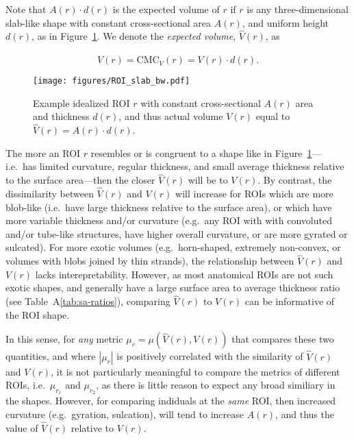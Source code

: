 \documentclass{article}
\begin{document}
Note that \(A(r) \cdot d(r)\) is the expected volume of \(r\) if \(r\) is any
three-dimensional slab-like shape with constant cross-sectional area
\(A(r)\), and uniform height \(d(r)\), as in Figure~\ref{fig:slab}. We denote
the \emph{expected volume}, \(\hat{V}(r)\), as

\begin{equation}
\hat{V}(r) = \text{CMC}_{V}(r) = V(r) \cdot d(r).
\end{equation}

\begin{figure}
	\centering
	\texttt{[image: figures/ROI\_slab\_bw.pdf]}
	\caption{Example idealized ROI \(r\) with constant cross-sectional \(A(r)\)
	area and thickness \(d(r)\), and thus actual volume \(V(r)\) equal to
	\(\hat{V}(r) = A(r) \cdot d(r)\).}
	\label{fig:slab}
\end{figure}

The more an ROI \(r\) resembles or is congruent to a shape like in
Figure~\ref{fig:slab}---i.e.\ has limited curvature, regular thickness, and
small average thickness relative to the surface area---then the closer
\(\hat{V}(r)\) will be to \(V(r)\). By contrast, the dissimilarity between
\(\hat{V}(r)\) and \(V(r)\) will increase for ROIs which are more blob-like
(i.e.\ have large thickness relative to the surface area), or which have more
variable thickness and/or curvature (e.g.\ any ROI with with convoluted
and/or tube-like structures, have higher overall curvature, or are more
gyrated or sulcated). For more exotic volumes (e.g.\ horn-shaped, extremely
non-convex, or volumes with blobs joined by thin strands), the relationship
between \(\hat{V}(r)\) and \(V(r)\) lacks interepretability. However, as most
anatomical ROIs are not such exotic shapes, and generally have a large
surface area to average thickness ratio (see Table~A\ref{tab:sa-ratios}),
comparing \(\hat{V}(r)\) to \(V(r)\) can be informative of the ROI shape.

In this sense, for \emph{any} metric \(\mu_r = \mu(\hat{V}(r), V(r))\) that
compares these two quantities, and where \(|\mu_r|\) is positively correlated
with the similarity of \(\hat{V}(r)\) and \(V(r)\), it is not particularly
meaningful to compare the metrics of different ROIs, i.e.\ \(\mu_{r_1}\) and
\(\mu_{r_2}\), as there is little reason to expect any broad similiary in the
shapes. However, for comparing indiduals at the \emph{same} ROI, then
increased curvature (e.g.\ gyration, sulcation), will tend to increase
\(A(r)\), and thus the value of \(\hat{V}(r)\) relative to \(V(r)\).
\end{document}
